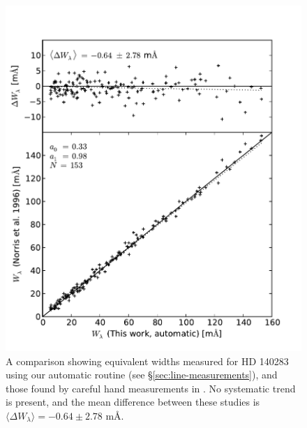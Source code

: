 \documentclass{emulateapj}
\begin{document}
\begin{figure}[h]
	\includegraphics[width=\columnwidth]{./figures/smh-norris.pdf}
	\caption{A comparison showing equivalent widths measured for HD 140283 using our automatic routine (see \S\ref{sec:line-measurements}), and those found by careful hand measurements in \citet{norris;et-al_1996}. No systematic trend is present, and the mean difference between these studies is $\langle\Delta{}W_\lambda\rangle = -0.64 \pm 2.78$ m\AA{}.}
	\label{fig:ew-compare}
\end{figure}
\end{document}

